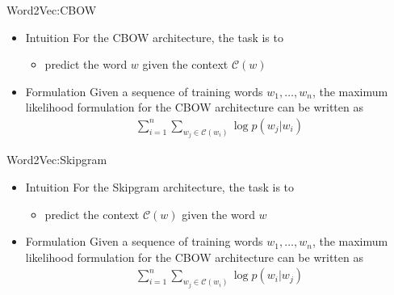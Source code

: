 \documentclass{beamer}
\begin{document}
\begin{frame}{Word2Vec:CBOW}
\begin{itemize}
 \item<2-> []
 \begin{block}{Intuition}
    For the CBOW architecture, the task is to 
    \begin{itemize}
     \item<3-> predict the word $w$ given the context $\mathcal{C}(w)$
    \end{itemize}

 \end{block}
 \item<4-> []
 \begin{block}{Formulation}
 Given a sequence of training words $w_1, \ldots, w_n$, the maximum likelihood formulation for 
 the CBOW architecture can be written as 
 \begin{align}  
  \sum_{i=1}^{n} \sum_{w_j \in \mathcal{C}(w_i)} \log{p(w_j|w_i)}
 \end{align} 
 \end{block}
 
\end{itemize} 
 
\end{frame}

\begin{frame}{Word2Vec:Skipgram}
 \begin{itemize}
 \item<2-> []
 \begin{block}{Intuition}
    For the Skipgram architecture, the task is to 
    \begin{itemize}
     \item<3-> predict the context $\mathcal{C}(w)$ given the word $w$
    \end{itemize}

 \end{block}
 \item<4-> []
 \begin{block}{Formulation}
 Given a sequence of training words $w_1, \ldots, w_n$, the maximum likelihood formulation for 
 the CBOW architecture can be written as 
 \begin{align}  
  \sum_{i=1}^{n} \sum_{w_j \in \mathcal{C}(w_i)} \log{p(w_i|w_j)}
 \end{align} 
 \end{block}
 
\end{itemize} 
\end{frame}
\end{document}
